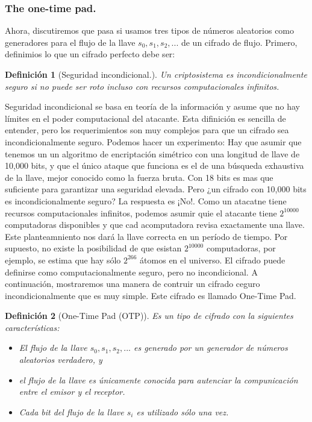 \documentclass{llncs}
\theoremstyle{plane}
\newtheorem{defi}{Definición}
\begin{document}
\subsubsection{The one-time pad.}

Ahora, discutiremos que pasa si usamos tres tipos de números aleatorios como generadores para el flujo de la llave $s_{0}, s_{1}, s_{2},...$ de un cifrado de flujo. Primero, definimios lo que un cifrado perfecto debe ser:

\begin{defi}[Seguridad incondicional.]
Un criptosistema es incondicionalmente seguro si no puede ser roto incluso con recursos computacionales infinitos.
\end{defi}

Seguridad incondicional se basa en teoría de la información y asume que no hay límites en el poder computacional del atacante. Esta difinición es sencilla de entender, pero los requerimientos son muy complejos para que un cifrado sea incondicionalmente seguro. Podemos hacer un experimento: Hay que asumir que tenemos un un algoritmo de encriptación simétrico con una longitud de llave de 10,000 bits, y que el único ataque que funciona es el de una búsqueda exhaustiva de la llave, mejor conocido como la fuerza bruta. Con 18 bits es mas que suficiente para garantizar una seguridad elevada. Pero ¿un cifrado con 10,000 bits es incondicionalmente seguro? La respuesta es ¡No!. Como un atacatne tiene recursos computacionales infinitos, podemos asumir quie el atacante tiene $2^{10000}$ computadoras disponibles y que cad acomputadora revisa exactamente una llave. Este planteamniento nos dará la llave correcta en un período de tiempo. Por supuesto, no existe la posibilidad de que esistan $2^{10000}$ computadoras, por ejemplo, se estima que hay sólo $2^{266}$ átomos en el universo. El cifrado puede definirse como computacionalmente seguro, pero no incondicional.
A continuación, mostraremos una manera de contruir un cifrado ceguro incondicionalmente que es muy simple. Este cifrado es llamado One-Time Pad.

\begin{defi}[One-Time Pad (OTP)]
Es un tipo de cifrado con la siguientes características:

\begin{itemize}
\item El flujo de la llave $s_{0}, s_{1}, s_{2}, ...$ es generado por un generador de números aleatorios verdadero, y
\item el flujo de la llave es únicamente conocida para autenciar la compunicación entre el emisor y el receptor.
\item Cada bit del flujo de la llave $s_{i}$ es utilizado sólo una vez. 
\end{itemize}
\end{defi}
\end{document}
